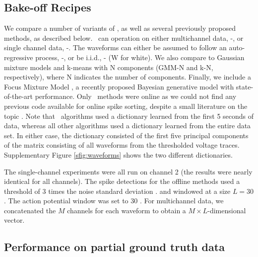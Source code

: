\subsection{Bake-off Recipes}

We compare a number of variants of \smug, as well as several previously proposed methods, as described below.  \smug~can operation on either multichannel data, \smug-, or single channel data, \smug-.  The waveforms can either be assumed to follow an auto-regressive process, \smug-, or be i.i.d., \smug- (W for white).   We also compare to Gaussian mixture models and k-means with N components (GMM-N and k-N, respectively), where N indicates the number of components.  Finally, we include a Focus Mixture Model \cite{??}, a recently proposed Bayesian generative model with state-of-the-art performance.  Only \smug~methods were online as we could not find any previous code available for online spike sorting, despite a small literature on the topic \cite{??}.  Note that \smug~algorithms used a dictionary learned from the first 5 seconds of data, whereas all other algorithms used a dictionary learned from the entire data set.  In either case, the dictionary consisted of the first five principal components of the matrix consisting of all waveforms from the thresholded voltage traces.  Supplementary Figure \ref{sfig:waveforms} shows the two different dictionaries.

% 
% 
The single-channel experiments were all run on channel 2 (the results were nearly identical for all channels).  The spike detections for the offline methods used a threshold of 3 times the noise standard deviation \cite{Lewicki}. and windowed at a size $L=30$.  The action potential window was set to 30 .  For multichannel data, we concatenated the $M$ channels for each waveform to obtain a $M\times L$-dimensional vector.



\subsection{Performance on partial ground truth data}

